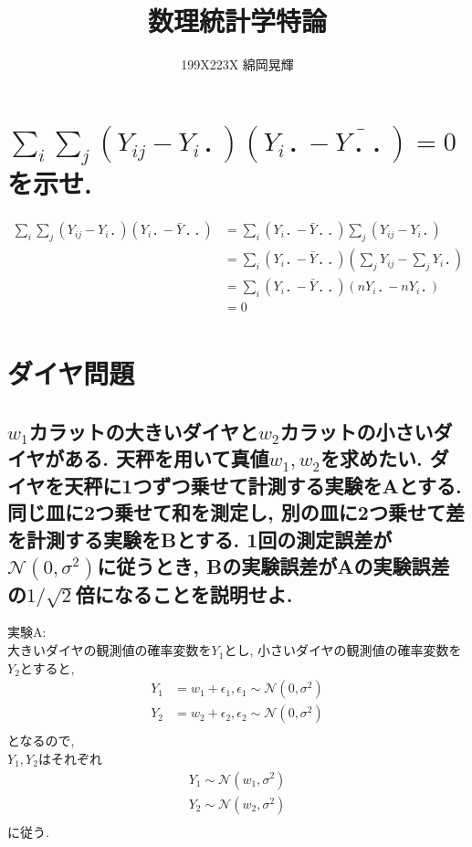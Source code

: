 \documentclass[uplatex]{jsarticle}
\title{\huge 数理統計学特論}
\author{199X223X 綿岡晃輝}
\affil{神戸大学大学院 システム情報学研究科 計算科学専攻}
\date{}
\begin{document}
    \maketitle
    \newpage
    
    \section{$\sum_{i}\sum_{j}(Y_{ij} - Y_{i・})(Y_{i・} - \bar{Y_{・・}}) = 0$を示せ.}
    \begin{align*}
        \sum_{i}\sum_{j}(Y_{ij} - Y_{i・})(Y_{i・} - \bar{Y}_{・・})
        &= \sum_{i}(Y_{i・} - \bar{Y}_{・・})\sum_{j}(Y_{ij} - Y_{i・}) \\
        &= \sum_{i}(Y_{i・} - \bar{Y}_{・・})(\sum_{j}Y_{ij} - \sum_{j}Y_{i・}) \\
        &= \sum_{i}(Y_{i・} - \bar{Y}_{・・})(nY_{i・} - nY_{i・}) \\
        &= 0 \\
    \end{align*}
    \newpage

    \section{ダイヤ問題}
    \subsection{$w_1$カラットの大きいダイヤと$w_2$カラットの小さいダイヤがある. 天秤を用いて真値$w_1, w_2$を求めたい. ダイヤを天秤に1つずつ乗せて計測する実験をAとする. 同じ皿に2つ乗せて和を測定し, 別の皿に2つ乗せて差を計測する実験をBとする. 1回の測定誤差が$\mathcal{N}(0, \sigma^2)$に従うとき, Bの実験誤差がAの実験誤差の$1/\sqrt{2}$倍になることを説明せよ.}

    \noindent
    実験A: \\
    大きいダイヤの観測値の確率変数を$Y_1$とし, 小さいダイヤの観測値の確率変数を$Y_2$とすると, 
    \begin{align*}
        Y_1 &= w_1 + \epsilon_1, \epsilon_1 \sim \mathcal{N}(0, \sigma^2) \\
        Y_2 &= w_2 + \epsilon_2, \epsilon_2 \sim \mathcal{N}(0, \sigma^2) \\
    \end{align*}
    となるので, \\
     $Y_1, Y_2$はそれぞれ
    \begin{align*}
        Y_1 \sim \mathcal{N}(w_1, \sigma^2) \\
        Y_2 \sim \mathcal{N}(w_2, \sigma^2) \\
    \end{align*}
    に従う. \\
\end{document}
